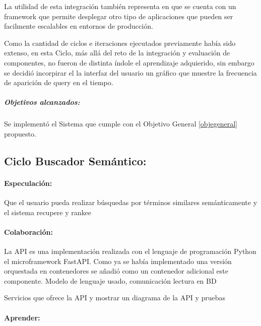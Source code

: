 \documentclass[
  12pt,
  openany]{book}
\begin{document}
La utilidad de esta integración también representa en que se cuenta con un framework que permite desplegar otro tipo de aplicaciones que pueden ser facilmente escalables en entornos de producción.

Como la cantidad de ciclos e iteraciones ejecutados previamente había sido extenso, en esta Ciclo, más allá del reto de la integración y evaluación de componentes, no fueron de distinta índole el aprendizaje adquierido, sin embargo se decidió incorpirar el la interfaz del usuario un gráfico que muestre la frecuencia de aparición de query en el tiempo.

\hypertarget{objetivos-alcanzados-2}{%
\subparagraph{Objetivos alcanzados:}\label{objetivos-alcanzados-2}}

Se implementó el Sistema que cumple con el Objetivo General \ref{objegeneral} propuesto.

\hypertarget{section}{%
\subparagraph{}\label{section}}

\hypertarget{desasarrollociclos5}{%
\subsection{Ciclo Buscador Semántico:}\label{desasarrollociclos5}}

\hypertarget{especulaciuxf3n-7}{%
\paragraph{Especulación:}\label{especulaciuxf3n-7}}

Que el usuario pueda realizar búsquedas por términos similares semánticamente y el sistema recupere y rankee

\hypertarget{colaboraciuxf3n-7}{%
\paragraph{Colaboración:}\label{colaboraciuxf3n-7}}

La API es una implementación realizada con el lenguaje de programación Python el microframework FastAPI. Como ya se había implementado una versión orquestada en contenedores se añadió como un contenedor adicional este componente. Modelo de lenguaje usado, comunicación lectura en BD

Servicios que ofrece la API y mostrar un diagrama de la API y pruebas

\hypertarget{aprender-5}{%
\paragraph{Aprender:}\label{aprender-5}}
\end{document}
